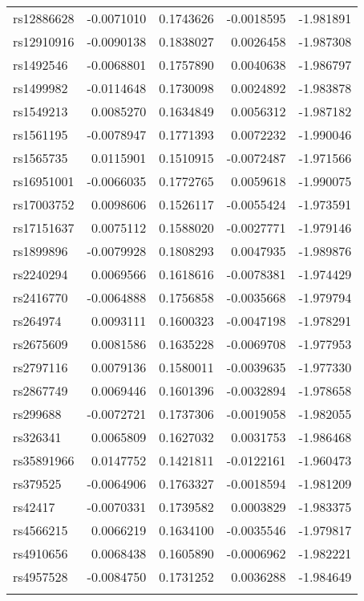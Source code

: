 \documentclass[AMA,STIX1COL,]{WileyNJD-v2}
\begin{document}
\begin{longtable}[t]{lrrrr}
\addlinespace
rs12886628 & -0.0071010 & 0.1743626 & -0.0018595 & -1.981891\\
rs12910916 & -0.0090138 & 0.1838027 & 0.0026458 & -1.987308\\
rs1492546 & -0.0068801 & 0.1757890 & 0.0040638 & -1.986797\\
rs1499982 & -0.0114648 & 0.1730098 & 0.0024892 & -1.983878\\
rs1549213 & 0.0085270 & 0.1634849 & 0.0056312 & -1.987182\\
\addlinespace
rs1561195 & -0.0078947 & 0.1771393 & 0.0072232 & -1.990046\\
rs1565735 & 0.0115901 & 0.1510915 & -0.0072487 & -1.971566\\
rs16951001 & -0.0066035 & 0.1772765 & 0.0059618 & -1.990075\\
rs17003752 & 0.0098606 & 0.1526117 & -0.0055424 & -1.973591\\
rs17151637 & 0.0075112 & 0.1588020 & -0.0027771 & -1.979146\\
\addlinespace
rs1899896 & -0.0079928 & 0.1808293 & 0.0047935 & -1.989876\\
rs2240294 & 0.0069566 & 0.1618616 & -0.0078381 & -1.974429\\
rs2416770 & -0.0064888 & 0.1756858 & -0.0035668 & -1.979794\\
rs264974 & 0.0093111 & 0.1600323 & -0.0047198 & -1.978291\\
rs2675609 & 0.0081586 & 0.1635228 & -0.0069708 & -1.977953\\
\addlinespace
rs2797116 & 0.0079136 & 0.1580011 & -0.0039635 & -1.977330\\
rs2867749 & 0.0069446 & 0.1601396 & -0.0032894 & -1.978658\\
rs299688 & -0.0072721 & 0.1737306 & -0.0019058 & -1.982055\\
rs326341 & 0.0065809 & 0.1627032 & 0.0031753 & -1.986468\\
rs35891966 & 0.0147752 & 0.1421811 & -0.0122161 & -1.960473\\
\addlinespace
rs379525 & -0.0064906 & 0.1763327 & -0.0018594 & -1.981209\\
rs42417 & -0.0070331 & 0.1739582 & 0.0003829 & -1.983375\\
rs4566215 & 0.0066219 & 0.1634100 & -0.0035546 & -1.979817\\
rs4910656 & 0.0068438 & 0.1605890 & -0.0006962 & -1.982221\\
rs4957528 & -0.0084750 & 0.1731252 & 0.0036288 & -1.984649\\
\addlinespace

\end{longtable}
\end{document}
